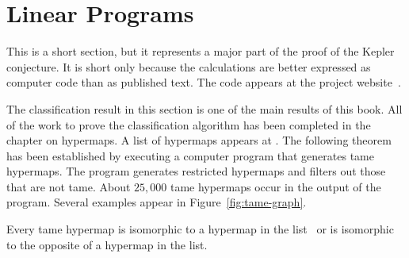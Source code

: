 %


\section{Linear Programs}\label{sec:tsp}
\label{sec:proof-classification}
\label{sec:classification}



This is a short section, but it represents a major part of the proof
of the Kepler conjecture.  It is short only because the calculations
are better expressed as computer code than as published text.  The
code appears at the project
website~\cite{website:FlyspeckProject}.  

The classification result in this section is one of the main results
of this book.  All of the work to prove the classification algorithm
has been completed in the chapter on hypermaps.  A list of hypermaps
appears at \cite{website:FlyspeckProject}.  The following theorem has
been established by executing a computer program that generates tame
hypermaps.  The program generates restricted hypermaps and filters out
those that are not tame.  About $25,000$ tame hypermaps occur in
the output of the program.  Several examples appear in
Figure~\ref{fig:tame-graph}.
%

\begin{theorem}
  \label{theorem:classification} Every tame hypermap is isomorphic to
  a hypermap in the list~\cite{website:FlyspeckProject} or is
  isomorphic to the opposite of a hypermap in the list.
\end{theorem}

